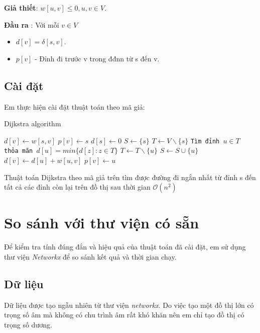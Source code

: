 \documentclass[../main-report.tex]{subfiles}
\begin{document}
\textbf{Giả thiết}: $w[u, v] \leqslant 0, u,v \in V$.

\textbf{Đầu ra} : Với mỗi $v \in V$
\begin{itemize}
\item $d[v] = \delta[s, v]$.
\item $p[v]$ - Đỉnh đi trước v trong đđnn từ s đến v.
\end{itemize}

\subsection{Cài đặt}
Em thực hiện cài đặt thuật toán theo mã giả:

\begin{algorithm}
\caption{Dijkstra algorithm}\label{Dijkstra}
\begin{algorithmic}[1]
         
    \State $d[v] \gets w[s, v]$
    \State $p[v] \gets s$
\EndFor
\State $d[s] \gets 0$
\State $S \gets \{s\}$         
\State $T \gets V\backslash \{s\}$   
    \texttt{Tìm đỉnh $u \in T$ thỏa mãn $d[u] = min\{d[z] : z\in T\}$}
    \State $T \gets T\backslash \{u\}$
    \State $S \gets S \cup \{u\}$       
                       
          
            \State $d[v] \gets d[u] + w[u, v]$
            \State $p[v] \gets u$
        \EndIf
    \EndFor
\EndWhile
\EndProcedure
\end{algorithmic}
\end{algorithm}

Thuật toán Dijkstra theo mã giả trên tìm được đường đi ngắn nhất từ đỉnh s đến tất cả các đỉnh còn lại trên đồ thị sau thời gian $\mathcal{O}(n^{2})$

\section{So sánh với thư viện có sẵn}
Để kiểm tra tính đúng đắn và hiệu quả của thuật toán đã cài đặt, em sử dụng thư viện \textit{Networkx} để so sánh kết quả và thời gian chạy.
\subsection{Dữ liệu}

Dữ liệu được tạo ngẫu nhiên từ thư viện \textit{networkx}. Do việc tạo một đồ thị lớn có trọng số âm mà không có chu trình âm rất khó khăn nên em chỉ tạo đồ thị có trọng số dương.
\end{document}
